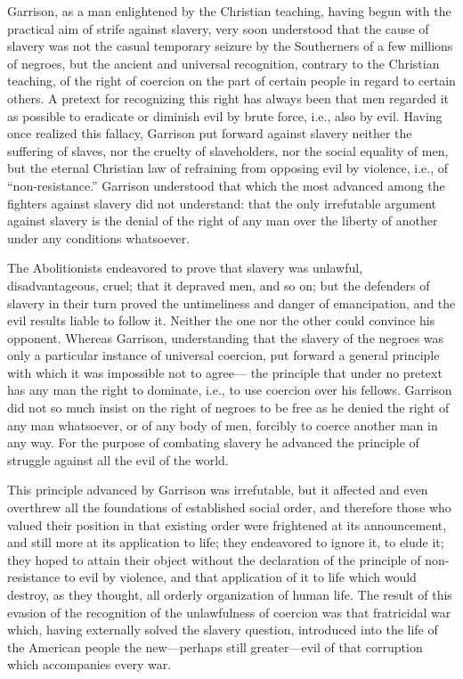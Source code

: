 \documentclass{book}
\begin{document}
Garrison, as a man enlightened by the Christian teaching, having begun with the practical aim of strife against slavery, very soon understood that the cause of slavery was not the casual temporary seizure by the Southerners of a few millions of negroes, but the ancient and universal recognition, contrary to the Christian teaching, of the right of coercion on the part of certain people in regard to certain others. A pretext for recognizing this right has always been that men regarded it as possible to eradicate or diminish evil by brute force, i.e., also by evil. Having once realized this fallacy, Garrison put forward against slavery neither the suffering of slaves, nor the cruelty of slaveholders, nor the social equality of men, but the eternal Christian law of refraining from opposing evil by violence, i.e., of “non-resistance.” Garrison understood that which the most advanced among the fighters against slavery did not understand: that the only irrefutable argument against slavery is the denial of the right of any man over the liberty of another under any conditions whatsoever.

The Abolitionists endeavored to prove that slavery was unlawful, disadvantageous, cruel; that it depraved men, and so on; but the defenders of slavery in their turn proved the untimeliness and danger of emancipation, and the evil results liable to follow it. Neither the one nor the other could convince his opponent. Whereas Garrison, understanding that the slavery of the negroes was only a particular instance of universal coercion, put forward a general principle with which it was impossible not to agree— the principle that under no pretext has any man the right to dominate, i.e., to use coercion over his fellows. Garrison did not so much insist on the right of negroes to be free as he denied the right of any man whatsoever, or of any body of men, forcibly to coerce another man in any way. For the purpose of combating slavery he advanced the principle of struggle against all the evil of the world.

This principle advanced by Garrison was irrefutable, but it affected and even overthrew all the foundations of established social order, and therefore those who valued their position in that existing order were frightened at its announcement, and still more at its application to life; they endeavored to ignore it, to elude it; they hoped to attain their object without the declaration of the principle of non-resistance to evil by violence, and that application of it to life which would destroy, as they thought, all orderly organization of human life. The result of this evasion of the recognition of the unlawfulness of coercion was that fratricidal war which, having externally solved the slavery question, introduced into the life of the American people the new—perhaps still greater—evil of that corruption which accompanies every war.
\end{document}
